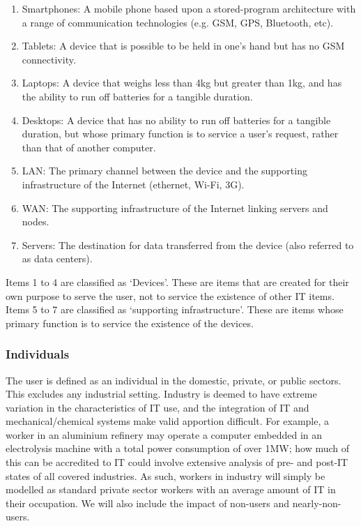 \documentclass[conference]{IEEEtran}
\begin{document}
\begin{enumerate}
\item Smartphones: A mobile phone based upon a stored-program
  architecture with a range of communication technologies (e.g. GSM, GPS,
  Bluetooth, etc).
\item Tablets: A device that is possible to be held in one’s hand but
  has no GSM connectivity.
\item Laptops: A device that weighs less than 4kg but greater
  than 1kg, and has the ability to run off batteries for a
  tangible duration.
\item Desktops: A device that has no ability to run off batteries for
  a tangible duration, but whose primary function is to service a
  user’s request, rather than that of another computer.
\item LAN: The primary channel between the device and the supporting
  infrastructure of the Internet (ethernet, Wi-Fi, 3G).
\item WAN: The supporting infrastructure of the Internet linking
  servers and nodes.
\item Servers: The destination for data transferred from the device
  (also referred to as data centers).
\end{enumerate}

Items 1 to 4 are classified as `Devices'. These are items that are
created for their own purpose to serve the user, not to service the
existence of other IT items. Items 5 to 7 are classified as
`supporting infrastructure'. These are items whose primary function is
to service the existence of the devices.

\subsubsection{Individuals}

The user is defined as an individual in the domestic, private, or
public sectors. This excludes any industrial setting. Industry is
deemed to have extreme variation in the characteristics of IT use, and
the integration of IT and mechanical/chemical systems make valid
apportion difficult. For example, a worker in an aluminium refinery
may operate a computer embedded in an electrolysis machine with a
total power consumption of over 1MW; how much of this can be
accredited to IT could involve extensive analysis of pre- and post-IT
states of all covered industries. As such, workers in industry will
simply be modelled as standard private sector workers with an average
amount of IT in their occupation. We will also include the impact of
non-users and nearly-non-users.
\end{document}

